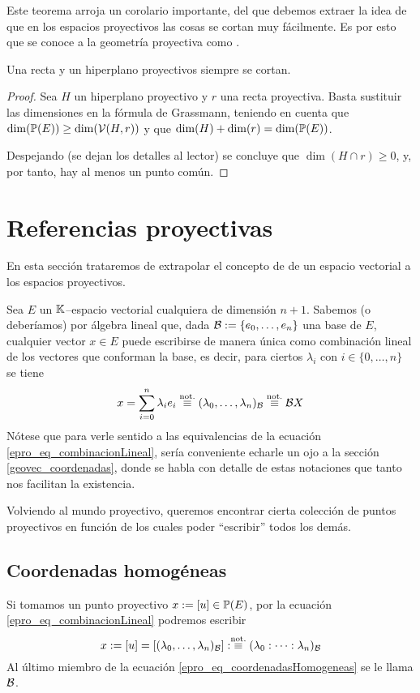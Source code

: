 Este teorema arroja un corolario importante, del que debemos extraer la idea de que en los espacios proyectivos las cosas se cortan muy fácilmente. Es por esto que se conoce a la geometría proyectiva como .
\begin{cor}
	Una recta y un hiperplano proyectivos siempre se cortan.
\end{cor}
\begin{proof}
	Sea $H$ un hiperplano proyectivo y $r$ una recta proyectiva. Basta sustituir las dimensiones en la fórmula de Grassmann, teniendo en cuenta que $\dim(\mathbb{P}(E))\geq\dim(\mathcal{V}(H,r))$ y que $\dim(H)+\dim(r)=\dim(\mathbb{P}(E))$.
	
	Despejando (se dejan los detalles al lector) se concluye que $\dim(H\cap r)\geq 0$, y, por tanto, hay al menos un punto común.
\end{proof}
\section{Referencias proyectivas}
En esta sección trataremos de extrapolar el concepto de  de un espacio vectorial a los espacios proyectivos.

Sea $E$ un $\mathbb{K}$--espacio vectorial cualquiera de dimensión $n+1$. Sabemos (o deberíamos) por álgebra lineal que, dada $\mathcal{B}:=\{e_0,\dots,e_n\}$ una base de $E$, cualquier vector $x\in E$ puede escribirse de manera única como combinación lineal de los vectores que conforman la base, es decir, para ciertos $\lambda_i$ con $i\in\{0,\dots,n\}$ se tiene
\begin{equation}
\label{epro_eq_combinacionLineal}
x=\sum_{i=0}^{n}\lambda_ie_i\stackrel{\textrm{not.}}{\equiv}(\lambda_0,\dots,\lambda_n)_{\mathcal{B}}\stackrel{\textrm{not.}}{\equiv}\mathcal{B}X
\end{equation}
Nótese que para verle sentido a las equivalencias de la ecuación \eqref{epro_eq_combinacionLineal}, sería conveniente echarle un ojo a la sección \ref{geovec_coordenadas}, donde se habla con detalle de estas notaciones que tanto nos facilitan la existencia.

Volviendo al mundo proyectivo, queremos encontrar cierta colección de puntos proyectivos en función de los cuales poder ``escribir'' todos los demás. 
\subsection{Coordenadas homogéneas}
\label{epro_coordenadasHomogeneas}
Si tomamos un punto proyectivo $x:=\left [ u \right ]\in\mathbb{P}(E)$, por la ecuación \eqref{epro_eq_combinacionLineal} podremos escribir
\begin{equation}
	\label{epro_eq_coordenadasHomogeneas}
	x:=\left [ u \right ]=\left [ (\lambda_0,\dots,\lambda_n)_{\mathcal{B}} \right ]:\stackrel{\textrm{not.}}{\equiv}(\lambda_0:\dots:\lambda_n)_{\mathcal{B}}
\end{equation}
Al último miembro de la ecuación \eqref{epro_eq_coordenadasHomogeneas} se le llama    $\mathcal{B}$.

